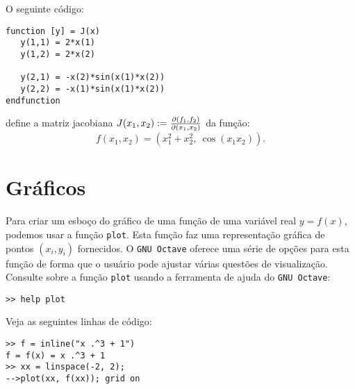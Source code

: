 \begin{ex}
  O seguinte código:
\begin{verbatim}
function [y] = J(x)
   y(1,1) = 2*x(1)
   y(1,2) = 2*x(2)

   y(2,1) = -x(2)*sin(x(1)*x(2))
   y(2,2) = -x(1)*sin(x(1)*x(2))
endfunction
\end{verbatim}
define a matriz jacobiana $J(x_1,x_2) := \frac{\partial(f_1,f_2)}{\partial(x_1,x_2)}$ da função:
\begin{equation*}
  f(x_1,x_2) = (x_1^2 + x_2^2,~\cos(x_1x_2)).
\end{equation*}
\end{ex}

\section{Gráficos}

Para criar um esboço do gráfico de uma função de uma variável real $y = f(x)$, podemos usar a função \verb+plot+. Esta função faz uma representação gráfica de pontos $(x_i, y_i)$ fornecidos. O \verb+GNU Octave+ oferece uma série de opções para esta função de forma que o usuário pode ajustar várias questões de visualização. Consulte sobre a função \verb+plot+ usando a ferramenta de ajuda do \verb+GNU Octave+:
\begin{verbatim}
>> help plot
\end{verbatim}

\begin{ex}
  Veja as seguintes linhas de código:
\begin{verbatim}
>> f = inline("x .^3 + 1")
f = f(x) = x .^3 + 1
>> xx = linspace(-2, 2);
-->plot(xx, f(xx)); grid on
\end{verbatim}
\end{ex}
